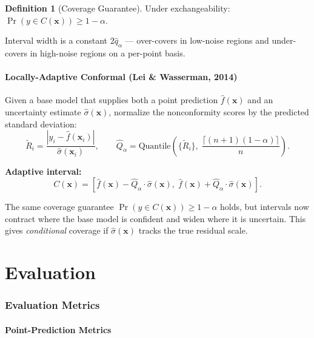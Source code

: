 \documentclass[11pt,a4paper]{article}
\theoremstyle{definition}
\newtheorem{definition}{Definition}[section]
\newcommand{\bx}{\mathbf{x}}
\begin{document}
\begin{definition}[Coverage Guarantee]
Under exchangeability:
$\Pr(y \in C(\bx)) \geq 1 - \alpha$.
\end{definition}

Interval width is a constant $2\hat{q}_\alpha$ --- over-covers in
low-noise regions and under-covers in high-noise regions on a
per-point basis.

\subsection{Locally-Adaptive Conformal (Lei \& Wasserman, 2014)}
\label{sec:conformal_adaptive}

Given a base model that supplies both a point prediction $\hat{f}(\bx)$
and an uncertainty estimate $\hat{\sigma}(\bx)$, normalize the
nonconformity scores by the predicted standard deviation:
\begin{equation}
  \tilde{R}_i = \frac{|y_i - \hat{f}(\bx_i)|}{\hat{\sigma}(\bx_i)},
  \qquad
  \hat{Q}_\alpha = \text{Quantile}\left(\{\tilde{R}_i\},\; \frac{\lceil (n+1)(1-\alpha) \rceil}{n}\right).
  \label{eq:lacw_quantile}
\end{equation}

\textbf{Adaptive interval:}
\[
  C(\bx) = \left[\hat{f}(\bx) - \hat{Q}_\alpha \cdot \hat{\sigma}(\bx),\;
                  \hat{f}(\bx) + \hat{Q}_\alpha \cdot \hat{\sigma}(\bx)\right].
\]

The same coverage guarantee $\Pr(y \in C(\bx)) \geq 1 - \alpha$ holds, but
intervals now contract where the base model is confident and widen where
it is uncertain. This gives \emph{conditional} coverage if
$\hat{\sigma}(\bx)$ tracks the true residual scale.

\part{Evaluation}

\section{Evaluation Metrics}
\label{sec:metrics}

\subsection{Point-Prediction Metrics}
\end{document}
